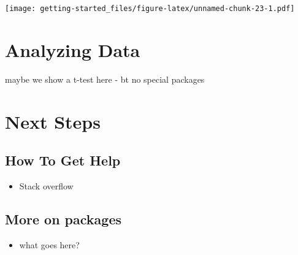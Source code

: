 \documentclass[]{book}
\newenvironment{Shaded}{\begin{snugshade}}{\end{snugshade}}
\newcommand{\KeywordTok}[1]{\textcolor[rgb]{0.13,0.29,0.53}{\textbf{#1}}}
\newcommand{\DataTypeTok}[1]{\textcolor[rgb]{0.13,0.29,0.53}{#1}}
\newcommand{\DecValTok}[1]{\textcolor[rgb]{0.00,0.00,0.81}{#1}}
\newcommand{\StringTok}[1]{\textcolor[rgb]{0.31,0.60,0.02}{#1}}
\newcommand{\OperatorTok}[1]{\textcolor[rgb]{0.81,0.36,0.00}{\textbf{#1}}}
\newcommand{\NormalTok}[1]{#1}
\providecommand{\tightlist}{%
  \setlength{\itemsep}{0pt}\setlength{\parskip}{0pt}}
\theoremstyle{definition}
\theoremstyle{definition}
\theoremstyle{definition}
\theoremstyle{remark}
\begin{document}
\begin{Shaded}
\end{Shaded}

\texttt{[image: getting-started\_files/figure-latex/unnamed-chunk-23-1.pdf]}

\chapter{Analyzing Data}\label{analyzing-data}

maybe we show a t-test here - bt no special packages

\chapter{Next Steps}\label{next-steps}

\section{How To Get Help}\label{how-to-get-help}

\begin{itemize}
\tightlist
\item
  Stack overflow
\end{itemize}

\section{More on packages}\label{more-on-packages}

\begin{itemize}
\tightlist
\item
  what goes here?
\end{itemize}
\end{document}
